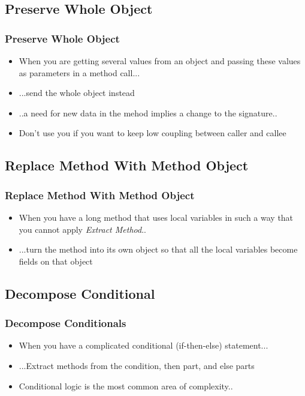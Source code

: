 \documentclass{beamer}
\begin{document}
\subsection{Preserve Whole Object}
\begin{frame}
  \frametitle{Preserve Whole Object}
  \begin{itemize}
	\item<+-> When you are getting several values from an object and passing these values as parameters in a method call...
	\item<+-> ...send the whole object instead
	\item<+-> ..a need for new data in the mehod implies a change to the signature..
	\item<+-> Don't use you if you want to keep low coupling between caller and callee
  \end{itemize}
\end{frame}

\subsection{Replace Method With Method Object}
\begin{frame}
  \frametitle{Replace Method With Method Object}
  \begin{itemize}
	\item<+-> When you have a long method that uses local variables in such a way that you cannot apply \textit{Extract Method}..
	\item<+-> ...turn the method into its own object so that all the local variables become fields on that object
   \end{itemize}
\end{frame}

\subsection{Decompose Conditional}
\begin{frame}
  \frametitle{Decompose Conditionals}
  \begin{itemize}
	\item<+-> When you have a complicated conditional (if-then-else) statement...
	\item<+-> ...Extract methods from the condition, then part, and else parts
	\item<+-> Conditional logic is the most common area of complexity.. 
   \end{itemize}
\end{frame}
\end{document}
